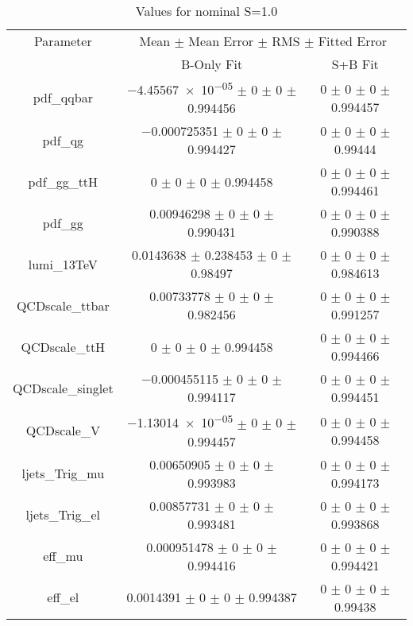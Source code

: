 \begin{table}
\centering
\caption{Values for nominal S=1.0}
\begin{tabular}{ccc}
\toprule
Parameter & \multicolumn{2}{c}{Mean $\pm$ Mean Error $\pm$ RMS $\pm$ Fitted Error}\\
 & B-Only Fit & S+B Fit\\
\midrule
pdf\_qqbar & \num{-4.45567e-05} $\pm$ \num{0} $\pm$ \num{0} $\pm$ \num{0.994456} & \num{0} $\pm$ \num{0} $\pm$ \num{0} $\pm$ \num{0.994457}\\
pdf\_qg & \num{-0.000725351} $\pm$ \num{0} $\pm$ \num{0} $\pm$ \num{0.994427} & \num{0} $\pm$ \num{0} $\pm$ \num{0} $\pm$ \num{0.99444}\\
pdf\_gg\_ttH & \num{0} $\pm$ \num{0} $\pm$ \num{0} $\pm$ \num{0.994458} & \num{0} $\pm$ \num{0} $\pm$ \num{0} $\pm$ \num{0.994461}\\
pdf\_gg & \num{0.00946298} $\pm$ \num{0} $\pm$ \num{0} $\pm$ \num{0.990431} & \num{0} $\pm$ \num{0} $\pm$ \num{0} $\pm$ \num{0.990388}\\
lumi\_13TeV & \num{0.0143638} $\pm$ \num{0.238453} $\pm$ \num{0} $\pm$ \num{0.98497} & \num{0} $\pm$ \num{0} $\pm$ \num{0} $\pm$ \num{0.984613}\\
QCDscale\_ttbar & \num{0.00733778} $\pm$ \num{0} $\pm$ \num{0} $\pm$ \num{0.982456} & \num{0} $\pm$ \num{0} $\pm$ \num{0} $\pm$ \num{0.991257}\\
QCDscale\_ttH & \num{0} $\pm$ \num{0} $\pm$ \num{0} $\pm$ \num{0.994458} & \num{0} $\pm$ \num{0} $\pm$ \num{0} $\pm$ \num{0.994466}\\
QCDscale\_singlet & \num{-0.000455115} $\pm$ \num{0} $\pm$ \num{0} $\pm$ \num{0.994117} & \num{0} $\pm$ \num{0} $\pm$ \num{0} $\pm$ \num{0.994451}\\
QCDscale\_V & \num{-1.13014e-05} $\pm$ \num{0} $\pm$ \num{0} $\pm$ \num{0.994457} & \num{0} $\pm$ \num{0} $\pm$ \num{0} $\pm$ \num{0.994458}\\
ljets\_Trig\_mu & \num{0.00650905} $\pm$ \num{0} $\pm$ \num{0} $\pm$ \num{0.993983} & \num{0} $\pm$ \num{0} $\pm$ \num{0} $\pm$ \num{0.994173}\\
ljets\_Trig\_el & \num{0.00857731} $\pm$ \num{0} $\pm$ \num{0} $\pm$ \num{0.993481} & \num{0} $\pm$ \num{0} $\pm$ \num{0} $\pm$ \num{0.993868}\\
eff\_mu & \num{0.000951478} $\pm$ \num{0} $\pm$ \num{0} $\pm$ \num{0.994416} & \num{0} $\pm$ \num{0} $\pm$ \num{0} $\pm$ \num{0.994421}\\
eff\_el & \num{0.0014391} $\pm$ \num{0} $\pm$ \num{0} $\pm$ \num{0.994387} & \num{0} $\pm$ \num{0} $\pm$ \num{0} $\pm$ \num{0.99438}\\

\end{tabular}
\end{table}
